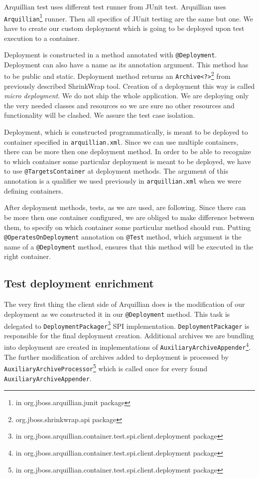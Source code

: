 \documentclass[12pt,final,oneside]{fithesis}
\begin{document}
Arquillian test uses different test runner from JUnit test. Arquillian uses \texttt{Arquillian}\footnote{in org.jboss.arquillian.junit package} runner. Then all specifics of JUnit testing are the same but one. We have to create our custom deployment which is going to be deployed upon test execution to a container.

	

Deployment is constructed in a method annotated with \texttt{@Deployment}. Deployment can also have a name as its annotation argument. This method has to be public and static. Deployment method returns an \texttt{Archive<?>}\footnote{org.jboss.shrinkwrap.api package} from previously described ShrinkWrap tool. Creation of a deployment this way is called \textit{micro deployment}. We do not ship the whole application. We are deploying only the very needed classes and resources so we are sure no other resources and functionality will be clashed. We assure the test case isolation.

Deployment, which is constructed programmatically, is meant to be deployed to container specified in \texttt{arquillian.xml}. Since we can use multiple containers, there can be more then one deployment method. In order to be able to recognize to which container some particular deployment is meant to be deployed, we have to use \texttt{@TargetsContainer} at deployment methods. The argument of this annotation is a qualifier we used previously in \texttt{arquillian.xml} when we were defining containers.

After deployment methods, tests, as we are used, are following. Since there can be more then one container configured, we are obliged to make difference between them, to specify on which container some particular method should run. Putting \texttt{@OperatesOnDeployment} annotation on \texttt{@Test} method, which argument is the name of a \texttt{@Deployment} method, ensures that this method will be executed in the right container.
		
		\subsection{Test deployment enrichment}

The very first thing the client side of Arquillian does is the modification of our deployment as we constructed it in our \texttt{@Deployment} method. This task is delegated to \texttt{DeploymentPackager}\footnote{in org.jboss.arquillian.container.test.spi.client.deployment package} SPI implementation. \texttt{DeploymentPackager} is responsible for the final deployment creation. Additional archives we are bundling into deployment are created in implementations of \texttt{AuxiliaryArchiveAppender}\footnote{in org.jboss.arquillian.container.test.spi.client.deployment package}. The further modification of archives added to deployment is processed by \texttt{AuxiliaryArchiveProcessor}\footnote{in org.jboss.arquillian.container.test.spi.client.deployment package} which is called once for every found \texttt{AuxiliaryArchiveAppender}.
\end{document}

